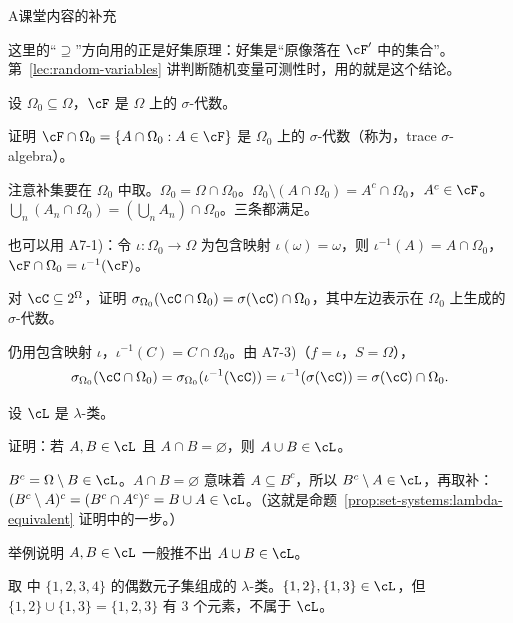 \begin{exercises}{A}{课堂内容的补充}
\begin{questions}
\begin{solution}
这里的“$\supseteq$”方向用的正是好集原理：好集是“原像落在 $\cF'$ 中的集合”。第~\ref{lec:random-variables} 讲判断随机变量可测性时，用的就是这个结论。
\end{solution}
\end{questions}

\item\label{ex:set-systems:A8} 设 $\Omega_0\subseteq\Omega$，$\cF$ 是 $\Omega$ 上的 $\sigma$-代数。
\begin{questions}
\item 证明 $\cF\cap\Omega_0=\{A\cap\Omega_0: A\in\cF\}$ 是 $\Omega_0$ 上的 $\sigma$-代数（称为，trace $\sigma$-algebra）。
\begin{solution}
注意补集要在 $\Omega_0$ 中取。$\Omega_0=\Omega\cap\Omega_0$。$\Omega_0\setminus(A\cap\Omega_0)=A^c\cap\Omega_0$，$A^c\in\cF$。$\bigcup_n(A_n\cap\Omega_0)=(\bigcup_nA_n)\cap\Omega_0$。三条都满足。

也可以用 A7-1)：令 $\iota:\Omega_0\to\Omega$ 为包含映射 $\iota(\omega)=\omega$，则 $\iota^{-1}(A)=A\cap\Omega_0$，$\cF\cap\Omega_0=\iota^{-1}(\cF)$。
\end{solution}
\item 对 $\cC\subseteq2^\Omega$，证明 $\sigma_{\Omega_0}(\cC\cap\Omega_0)=\sigma(\cC)\cap\Omega_0$，其中左边表示在 $\Omega_0$ 上生成的 $\sigma$-代数。
\begin{solution}
仍用包含映射 $\iota$，$\iota^{-1}(C)=C\cap\Omega_0$。由 A7-3)（$f=\iota$，$S=\Omega$），
\[
\sigma_{\Omega_0}(\cC\cap\Omega_0)=\sigma_{\Omega_0}(\iota^{-1}(\cC))=\iota^{-1}(\sigma(\cC))=\sigma(\cC)\cap\Omega_0 .
\]
\end{solution}
\end{questions}

\item\label{ex:set-systems:A9} 设 $\cL$ 是 $\lambda$-类。
\begin{questions}
\item 证明：若 $A,B\in\cL$ 且 $A\cap B=\varnothing$，则 $A\cup B\in\cL$。
\begin{solution}
$B^c=\Omega\setminus B\in\cL$。$A\cap B=\varnothing$ 意味着 $A\subseteq B^c$，所以 $B^c\setminus A\in\cL$，再取补：$(B^c\setminus A)^c=(B^c\cap A^c)^c=B\cup A\in\cL$。（这就是命题~\ref{prop:set-systems:lambda-equivalent} 证明中的一步。）
\end{solution}
\item 举例说明 $A,B\in\cL$ 一般推不出 $A\cup B\in\cL$。
\begin{solution}
取 中 $\{1,2,3,4\}$ 的偶数元子集组成的 $\lambda$-类。$\{1,2\},\{1,3\}\in\cL$，但 $\{1,2\}\cup\{1,3\}=\{1,2,3\}$ 有 $3$ 个元素，不属于 $\cL$。
\end{solution}
\end{questions}
\end{exercises}

